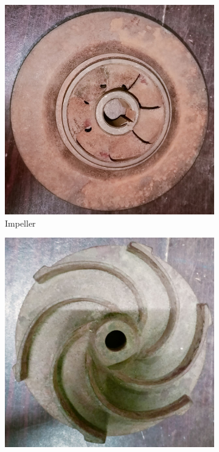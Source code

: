 \documentclass[12pt]{article}
\begin{document}
\begin{figure}
  \vspace{0.5cm}

  \begin{subfigure}{0.3\textwidth}
      \includegraphics[width=\linewidth]{img/p_04.jpg}
      \caption{Impeller}
  \end{subfigure}
  \hfill
  \begin{subfigure}{0.3\textwidth}
      \includegraphics[width=\linewidth]{img/p_05.jpg}

\end{subfigure}
\end{figure}
\end{document}

